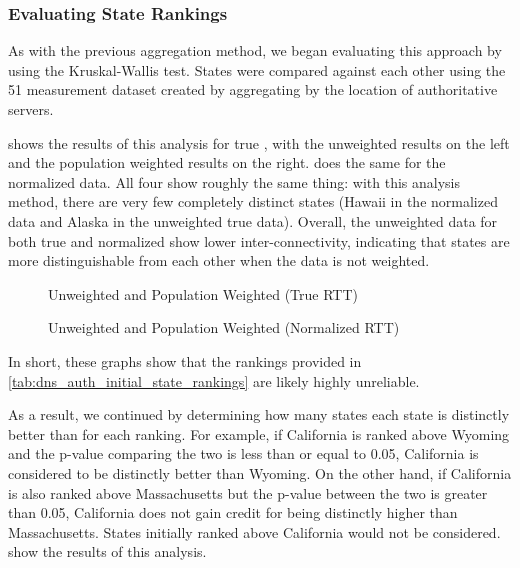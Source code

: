 

\subsubsection{Evaluating State Rankings}

As with the previous aggregation method, we began evaluating this approach by using the Kruskal-Wallis test. States were compared against each other using the 51 measurement dataset created by aggregating by the location of authoritative servers.

 shows the results of this analysis for true \rtt, with the unweighted results on the left and the population weighted results on the right.  does the same for the normalized data. All four show roughly the same thing: with this analysis method, there are very few completely distinct states (Hawaii in the normalized data and Alaska in the unweighted true \rtt data). Overall, the unweighted data for both true \rtt and normalized \rtt show lower inter-connectivity, indicating that states are more distinguishable from each other when the data is not weighted.

\begin{figure}[H]
    \centering
    
    
    \caption{Unweighted and Population Weighted (True RTT)}
    \label{fig:dns_auth_agg_s2s_true_rtt_graphs}
\end{figure}

\begin{figure}[H]
    \centering
    
    
    \caption{Unweighted and Population Weighted (Normalized RTT)}
    \label{fig:dns_auth_agg_s2s_norm_rtt_graphs}
\end{figure}

In short, these graphs show that the rankings provided in \cref{tab:dns_auth_initial_state_rankings} are likely highly unreliable.

As a result, we continued by determining how many states each state is distinctly better than for each ranking. For example, if California is ranked above Wyoming and the p-value comparing the two is less than or equal to 0.05, California is considered to be distinctly better than Wyoming. On the other hand, if California is also ranked above Massachusetts but the p-value between the two is greater than 0.05, California does not gain credit for being distinctly higher than Massachusetts. States initially ranked above California would not be considered.  show the results of this analysis.

